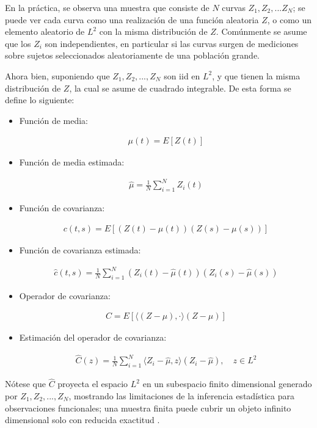 \documentclass[
]{book}
\begin{document}
En la práctica, se observa una muestra que consiste de \(N\) curvas \(Z_1,Z_2,...Z_N\); se puede ver cada curva como una realización de una función aleatoria \(Z\), o como un elemento aleatorio de \(L^2\) con la misma distribución de \(Z\). Comúnmente se asume que los \(Z_i\) son independientes, en particular si las curvas surgen de mediciones sobre sujetos seleccionados aleatoriamente de una población grande.

Ahora bien, suponiendo que \(Z_1,Z_2,...,Z_N\) son iid en \(L^2\), y que tienen la misma distribución de \(Z\), la cual se asume de cuadrado integrable. De esta forma se define lo siguiente:

\begin{itemize}
\item
  Función de media:

  \begin{align}
        \mu(t)=E[Z(t)]
    \end{align}
\item
  Función de media estimada:

  \begin{align}
        {\hat{\mu}}=\frac{1}{N}\sum_{i=1}^N Z_i(t)
    \end{align}
\item
  Función de covarianza:

  \begin{align}
        c(t,s)=E[(Z(t)-\mu(t))(Z(s)-\mu(s))]
    \end{align}
\item
  Función de covarianza estimada:

  \begin{align}
        {\hat{c}}(t,s)=\frac{1}{N}\sum_{i=1}^N(Z_i(t)-{\hat{\mu}}(t))(Z_i(s)-{\hat{\mu}}(s))
    \end{align}
\item
  Operador de covarianza:

  \begin{align}
        C=E[\langle(Z-\mu),\cdot \rangle (Z-\mu)]
    \end{align}
\item
  Estimación del operador de covarianza:

  \begin{align}
        {\hat{C}}(z)= \frac{1}{N} \sum_{i=1}^{N} \langle Z_i - {\hat{\mu}}, z\rangle ( Z_i-{\hat{\mu}}), \quad z\in L^2
    \end{align}
\end{itemize}

Nótese que \({\hat{C}}\) proyecta el espacio \(L^2\) en un subespacio finito dimensional generado por \(Z_1,Z_2,...,Z_N\), mostrando las limitaciones de la inferencia estadística para observaciones funcionales; una muestra finita puede cubrir un objeto infinito dimensional solo con reducida exactitud \citep{lajos}.
\end{document}
